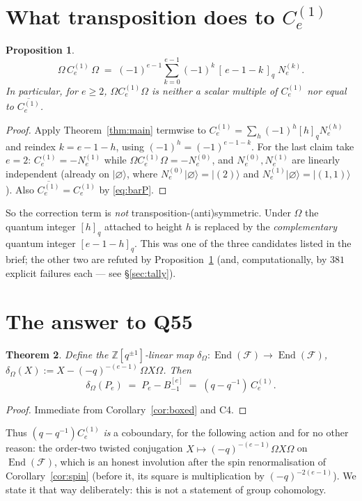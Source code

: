 \documentclass[11pt]{article}
\theoremstyle{plain}
\newtheorem{theorem}{Theorem}
\newtheorem{proposition}[theorem]{Proposition}
\theoremstyle{definition}
\DeclareMathOperator{\End}{End}
\newcommand{\F}{\mathcal{F}}
\newcommand{\Om}{\Omega}
\newcommand{\qq}{(q-q^{-1})}
\newcommand{\Bm}{B_{-1}^{[e]}}
\newcommand{\Ce}{C_e^{(1)}}
\newcommand{\N}[1]{N_e^{(#1)}}
\begin{document}
\section{What transposition does to $\Ce$}

\begin{proposition}\label{prop:Cim}
\[
  \Om\,\Ce\,\Om \;=\; (-1)^{e-1}\sum_{k=0}^{e-1}(-1)^{k}\,[\,e-1-k\,]_q\;\N{k}.
\]
In particular, for $e\ge2$, $\Om\Ce\Om$ is neither a scalar multiple of $\Ce$
nor equal to $\overline{\Ce}$.
\end{proposition}
\begin{proof}
Apply Theorem~\ref{thm:main} termwise to $\Ce=\sum_h(-1)^h[h]_q\N{h}$ and
reindex $k=e-1-h$, using $(-1)^{h}=(-1)^{e-1-k}$.
For the last claim take $e=2$: $\Ce=-\N{1}$ while $\Om\Ce\Om=-\N{0}$, and
$\N{0},\N{1}$ are linearly independent (already on $\lvert\varnothing\rangle$,
where $\N{0}\lvert\varnothing\rangle=\lvert(2)\rangle$ and
$\N{1}\lvert\varnothing\rangle=\lvert(1,1)\rangle$).  Also
$\overline{\Ce}=\Ce$ by \eqref{eq:barP}.
\end{proof}

So the correction term is \emph{not} transposition-(anti)symmetric.  Under
$\Om$ the quantum integer $[h]_q$ attached to height $h$ is replaced by the
\emph{complementary} quantum integer $[e-1-h]_q$.  This was one of the three
candidates listed in the brief; the other two are refuted by
Proposition~\ref{prop:Cim} (and, computationally, by $381$ explicit failures
each --- see \S\ref{sec:tally}).

\section{The answer to Q55}

\begin{theorem}\label{thm:q55}
Define the $\mathbb{Z}[q^{\pm1}]$-linear map
$\delta_\Om\colon\End(\F)\to\End(\F)$,
$\delta_\Om(X):=X-(-q)^{-(e-1)}\,\Om X\Om$.  Then
\[
  \delta_\Om(P_e)\;=\;P_e-\Bm\;=\;\qq\,\Ce .
\]
\end{theorem}
\begin{proof}
Immediate from Corollary~\ref{cor:boxed} and C4.
\end{proof}

Thus $\qq\Ce$ \emph{is} a coboundary, for the following action and for no
other reason: the order-two twisted conjugation $X\mapsto(-q)^{-(e-1)}\Om X\Om$
on $\End(\F)$, which is an honest involution after the spin renormalisation of
Corollary~\ref{cor:spin} (before it, its square is multiplication by
$(-q)^{-2(e-1)}$).  We state it that way deliberately: this is not a statement
of group cohomology.
\end{document}
